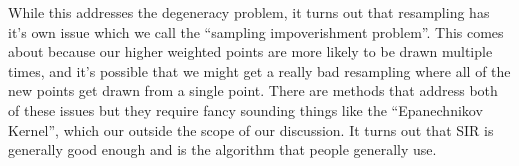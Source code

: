 \documentclass{article}
\begin{document}
While this addresses the degeneracy problem, it turns out that resampling has it's own issue which we call the ``sampling impoverishment problem''. This comes about because our higher weighted points are more likely to be drawn multiple times, and it's possible that we might get a really bad resampling where all of the new points get drawn from a single point. There are methods that address both of these issues but they require fancy sounding things like the ``Epanechnikov Kernel'', which our outside the scope of our discussion. It turns out that SIR is generally good enough and is the algorithm that people generally use.










\end{document}
